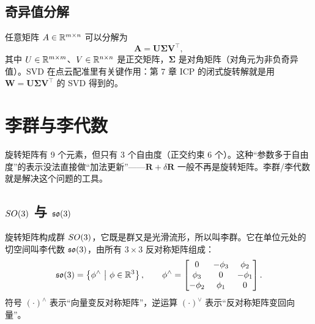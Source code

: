 \subsection{奇异值分解}

任意矩阵 $A\in\mathbb{R}^{m\times n}$ 可以分解为
\begin{equation}
\bm{A}=\bm{U}\bm{\Sigma}\bm{V}^{\top},
\end{equation}
其中 $U\in\mathbb{R}^{m\times m}$、$V\in\mathbb{R}^{n\times n}$ 是正交矩阵，$\bm{\Sigma}$ 是对角矩阵（对角元为非负奇异值）。SVD 在点云配准里有关键作用：第 7 章 ICP 的闭式旋转解就是用 $\bm{W}=\bm{U}\bm{\Sigma}\bm{V}^{\top}$ 的 SVD 得到的。

\section{李群与李代数}\label{sec:02-lie}

旋转矩阵有 9 个元素，但只有 3 个自由度（正交约束 6 个）。这种“参数多于自由度”的表示没法直接做“加法更新”——$\bm{R}+\delta\bm{R}$ 一般不再是旋转矩阵。李群/李代数就是解决这个问题的工具。

\subsection{$SO(3)$ 与 $\mathfrak{so}(3)$}

旋转矩阵构成群 $SO(3)$，它既是群又是光滑流形，所以叫李群。它在单位元处的切空间叫李代数 $\mathfrak{so}(3)$，由所有 $3\times3$ 反对称矩阵组成：
\begin{equation}
\so(3)=\left\{\bm{\phi}^{\wedge}\ \middle|\ \bm{\phi}\in\R^{3}\right\},\qquad
\bm{\phi}^{\wedge}=\begin{bmatrix}0&-\phi_3&\phi_2\\ \phi_3&0&-\phi_1\\ -\phi_2&\phi_1&0\end{bmatrix}.
\label{eq:02-hat}
\end{equation}
符号 $(\cdot)^{\wedge}$ 表示“向量变反对称矩阵”，逆运算 $(\cdot)^{\vee}$ 表示“反对称矩阵变回向量”。


